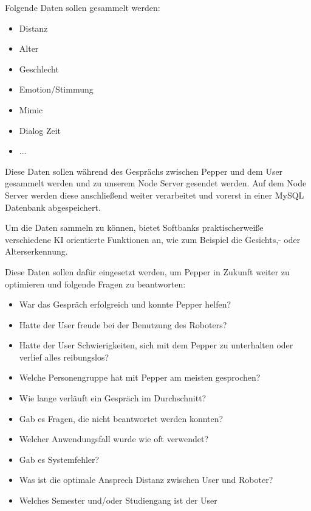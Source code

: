 Folgende Daten sollen gesammelt werden:
\begin{itemize}
    \item Distanz
    \item Alter
    \item Geschlecht
    \item Emotion/Stimmung 
    \item Mimic
    \item Dialog Zeit
    \item ...
\end{itemize}

Diese Daten sollen während des Gesprächs zwischen Pepper und dem User gesammelt werden und zu unserem Node Server gesendet werden. 
Auf dem Node Server werden diese anschließend weiter verarbeitet und vorerst in einer MySQL Datenbank abgespeichert.

Um die Daten sammeln zu können, bietet Softbanks praktischerweiße verschiedene KI orientierte Funktionen an, wie zum Beispiel die Gesichts,- oder Alterserkennung. 

Diese Daten sollen dafür eingesetzt werden, um Pepper in Zukunft weiter zu optimieren und folgende Fragen zu beantworten:
\begin{itemize}
    \item War das Gespräch erfolgreich und konnte Pepper helfen?
    \item Hatte der User freude bei der Benutzung des Roboters?
    \item Hatte der User Schwierigkeiten, sich mit dem Pepper zu unterhalten oder verlief alles reibungslos? 
    \item Welche Personengruppe hat mit Pepper am meisten gesprochen?
    \item Wie lange verläuft ein Gespräch im Durchschnitt?
    \item Gab es Fragen, die nicht beantwortet werden konnten?
    \item Welcher Anwendungsfall wurde wie oft verwendet?
    \item Gab es Systemfehler?
    \item Was ist die optimale Ansprech Distanz zwischen User und Roboter?
    \item Welches Semester und/oder Studiengang ist der User
\end{itemize}